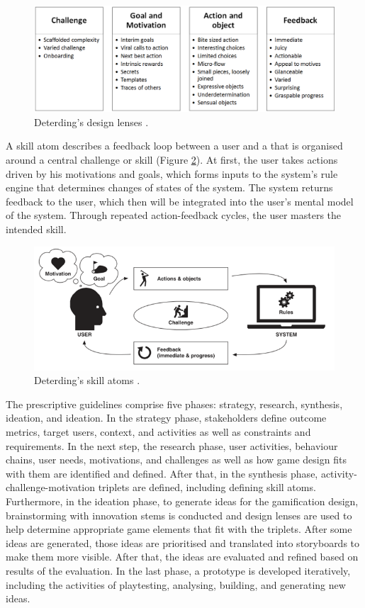\documentclass[12pt, a4paper]{report}
\begin{document}
{\begin{figure}[ht]
\centering
\includegraphics[width=12cm]{lenses}
\caption{Deterding's design lenses \cite{deterding2015lens}.}
\label{lenses}
\end{figure}


A skill atom describes a feedback loop between a user and a that is organised around a central challenge or skill (Figure \ref{skill-atoms}). At first, the user takes actions driven by his motivations and goals, which forms inputs to the system's rule engine that determines changes of states of the system. The system returns feedback to the user, which then will be integrated into the user's mental model of the system. Through repeated action-feedback cycles, the user masters the intended skill.

\begin{figure}[ht]
\centering
\includegraphics[width=12cm]{skill-atoms}
\caption{Deterding's skill atoms \cite{deterding2015lens}.}
\label{skill-atoms}
\end{figure}

The prescriptive guidelines comprise five phases: strategy, research, synthesis, ideation, and ideation. In the strategy phase, stakeholders define outcome metrics, target users, context, and activities as well as constraints and requirements. In the next step, the research phase, user activities, behaviour chains, user needs, motivations, and challenges as well as how game design fits with them are identified and defined. After that, in the synthesis phase, activity-challenge-motivation triplets are defined, including defining skill atoms. Furthermore, in the ideation phase, to generate ideas for the gamification design, brainstorming with innovation stems is conducted and design lenses are used to help determine appropriate game elements that fit with the triplets. After some ideas are generated, those ideas are prioritised and translated into storyboards to make them more visible. After that, the ideas are evaluated and refined based on results of the evaluation. In the last phase, a prototype is developed iteratively, including the activities of playtesting, analysing, building, and generating new ideas. 

}
\end{document}
